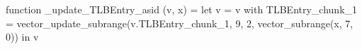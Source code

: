 function _update_TLBEntry_asid (v, x) = let v = { v with TLBEntry_chunk_1 = vector_update_subrange(v.TLBEntry_chunk_1, 9, 2, vector_subrange(x, 7, 0)) } in v

